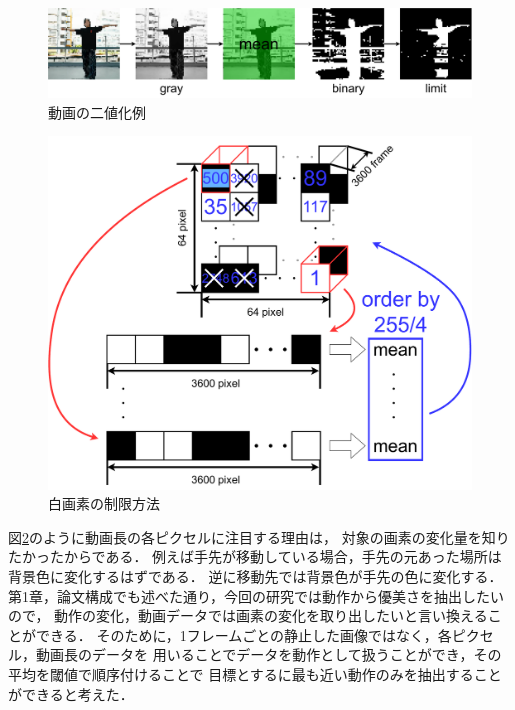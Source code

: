 \begin{figure}[b]
  \begin{center}
    \includegraphics[width=120mm]{images/chart/binary.pdf}
  \end{center}
  \caption{動画の二値化例}
  \label{binary}
\end{figure}
\clearpage

\begin{figure}[t]
  \begin{center}
    \includegraphics[width=120mm]{images/chart/choice.pdf}
  \end{center}
  \caption{白画素の制限方法}
  \label{choice}
\end{figure}

図\ref{choice}のように動画長の各ピクセルに注目する理由は，
対象の画素の変化量を知りたかったからである．
例えば手先が移動している場合，手先の元あった場所は背景色に変化するはずである．
逆に移動先では背景色が手先の色に変化する．
第1章，論文構成でも述べた通り，今回の研究では動作から優美さを抽出したいので，
動作の変化，動画データでは画素の変化を取り出したいと言い換えることができる．
そのために，1フレームごとの静止した画像ではなく，各ピクセル，動画長のデータを
用いることでデータを動作として扱うことができ，その平均を閾値で順序付けることで
目標とするに最も近い動作のみを抽出することができると考えた．

